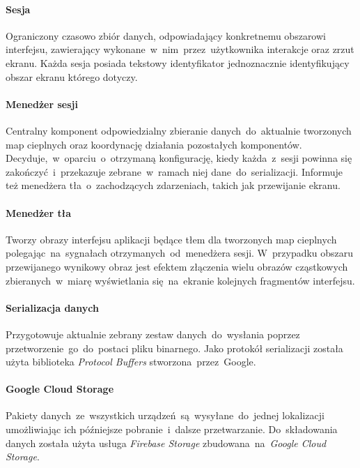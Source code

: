 \paragraph{Sesja}
\label{par:rs_session}
Ograniczony czasowo zbiór danych, odpowiadający konkretnemu obszarowi interfejsu, zawierający wykonane~w~nim~przez~użytkownika interakcje oraz zrzut ekranu. Każda sesja posiada tekstowy identyfikator jednoznacznie identyfikujący obszar ekranu którego dotyczy.

\paragraph{Menedżer sesji} 
\label{par:rs_session_manager}
Centralny komponent odpowiedzialny zbieranie danych~do~aktualnie tworzonych map cieplnych oraz koordynację działania pozostałych komponentów. Decyduje,~w~oparciu~o~otrzymaną konfigurację, kiedy każda~z~sesji powinna się zakończyć~i~przekazuje zebrane~w~ramach niej dane~do~serializacji. Informuje też menedżera tła~o~zachodzących zdarzeniach, takich jak przewijanie ekranu.

\paragraph{Menedżer tła} 
\label{par:rs_bg_manager}
Tworzy obrazy interfejsu aplikacji będące tłem dla tworzonych map cieplnych polegając~na~sygnałach otrzymanych~od~menedżera sesji. W~przypadku obszaru przewijanego wynikowy obraz jest efektem złączenia wielu  obrazów cząstkowych zbieranych~w~miarę wyświetlania się~na~ekranie kolejnych fragmentów interfejsu.

\paragraph{Serializacja danych}
Przygotowuje aktualnie zebrany zestaw danych~do~wysłania poprzez przetworzenie~go~do~postaci pliku binarnego. Jako protokół serializacji została użyta biblioteka {\it Protocol Buffers} stworzona~przez~Google.

\paragraph{Google Cloud Storage}
Pakiety danych~ze~wszystkich urządzeń~są~wysyłane~do~jednej lokalizacji umożliwiając ich późniejsze pobranie~i~dalsze przetwarzanie. Do~składowania danych została użyta usługa {\it Firebase Storage} zbudowana~na~{\it Google Cloud Storage}.

